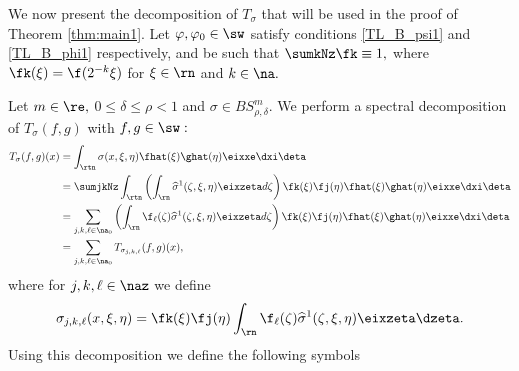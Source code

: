 We now present the decomposition of $T_\sigma$ that will be used in the proof of Theorem \ref{thm:main1}. Let $\varphi,\varphi_0 \in \sw$ satisfy conditions \ref{TL_B_psi1} and \ref{TL_B_phi1} respectively, and be such that $\sumkNz \fk \equiv 1,$ where $\fk(\xi)=\f(2^{-k}\xi)$ for $\xi\in\rn$ and $k\in\na.$

Let $m \in \re,$ $0 \leq \delta\le \rho < 1$ and $\sigma \in BS^m_{\rho, \delta}.$  We perform a spectral decomposition of $T_\sigma(f,g)$ with $f,g\in\sw:$
\begin{align*}
T_\sigma(f,g)(x)&= \int_{\rtn} \sigma(x, \xi, \eta) \fhat(\xi) \ghat(\eta) \eixxe \dxi \deta \\
& =  \sumjkNz \int_{\rtn} \left( \int_{\rn} \widehat{\sigma}^1(\zeta, \xi, \eta) \eixzeta  d\zeta \right) \fk(\xi) \fj(\eta) \fhat(\xi) \ghat(\eta) \eixxe \dxi \deta\\
& =  \sum_{j,k,\ell\in\na_0} \left( \int_{\rn} \f_\ell(\zeta)\widehat{\sigma}^1(\zeta, \xi, \eta) \eixzeta  d\zeta \right) \fk(\xi) \fj(\eta) \fhat(\xi) \ghat(\eta) \eixxe \dxi \deta\\
&= \sum_{j,k,\ell\in\na_0}  T_{\sigma_{j,k,\ell}}(f,g)(x),
\end{align*}
where for $j,k, \ell \in \naz$ we define
\begin{equation*}
\sigma_{j,k,\ell}(x, \xi, \eta)= \fk(\xi) \fj(\eta) \int_{\rn}  \f_\ell(\zeta) \widehat{\sigma}^1(\zeta, \xi, \eta) \eixzeta  \dzeta.
\end{equation*}
Using this decomposition we define the following symbols


